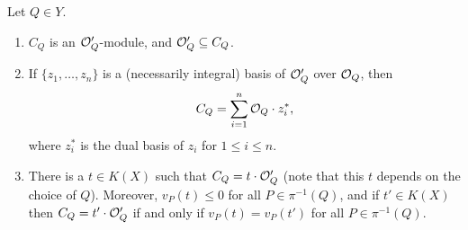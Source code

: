 \begin{prop}\label{factsaboutc'}
Let $Q\in Y$. 
 \begin{enumerate}
  \item $C_Q$ is an ${\cal O}_Q'$-module, and ${\cal O}_Q' \subseteq C_Q$.
  \item If $\{z_1,\ldots ,z_n\}$ is a (necessarily integral) basis of ${\cal O}_Q'$ over ${\cal O}_Q$, then 
  \[
   C_Q = \sum_{i=1}^n {\cal O}_Q\cdot z_i^*,
  \]
where $z_i^*$ is the dual basis of $z_i$ for $1\leq i \leq n$.
  \item There is a $t\in K(X)$ such that $C_Q = t\cdot {\cal O}_Q'$ (note that this $t$ depends on the choice of $Q$).
  Moreover, $v_P(t) \leq 0$ for all $P\in \pi^{-1}(Q)$, and if $t'\in K(X)$ then $C_Q=t'\cdot {\cal O}_Q'$ if and only if $v_P(t) = v_P(t')$ for all $P\in \pi^{-1}(Q)$.

 \end{enumerate}
\end{prop}
